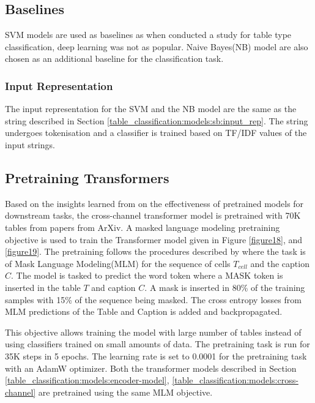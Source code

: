 \subsection{Baselines}
SVM models are used as baselines as when \cite{kim2012scientific} conducted a study for table type classification, deep learning was not as popular. Naive Bayes(NB) model are also chosen as an additional baseline for the classification task. 

\subsubsection{Input Representation}
The input representation for the SVM and the NB model are the same as the string described in Section \ref{table_classification:models:sb:input_rep}. The string undergoes tokenisation and a classifier is trained based on TF/IDF values of the input strings. 

\subsection{Pretraining Transformers}
\label{table_classification:models:encoder-model:pre-train}
Based on the insights learned from \cite{hernandez2021scaling} on the effectiveness of pretrained models for downstream tasks, the cross-channel transformer model is pretrained with 70K tables from papers from ArXiv. A masked language modeling pretraining objective is used to train the Transformer model given in Figure \ref{figure18}, and \ref{figure19}. The pretraining follows the procedures described by \cite{deng2020turl} where the task is of Mask Language Modeling(MLM) for the sequence of cells $T_{cell}$ and the caption $C$. The model is tasked to predict the word token where a MASK token is inserted in the table $T$ and caption $C$. A mask is inserted in 80\% of the training samples with 15\% of the sequence being masked. The cross entropy losses from MLM predictions of the Table and Caption is added and backpropagated. 

This objective allows training the model with large number of tables instead of using classifiers trained on small amounts of data. The pretraining task is run for 35K steps in 5 epochs. The learning rate is set to 0.0001 for the pretraining task with an AdamW optimizer. Both the transformer models described in Section \ref{table_classification:models:encoder-model}, \ref{table_classification:models:cross-channel} are pretrained using the same MLM objective. 


